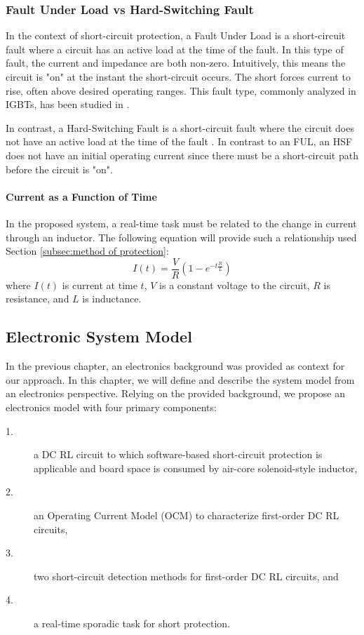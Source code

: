 \subsubsection{Fault Under Load vs Hard-Switching Fault}
In the context of short-circuit protection, a Fault Under Load is a short-circuit fault where a circuit has an active load at the time of the fault. In this type of fault, the current and impedance are both non-zero. Intuitively, this means the circuit is "on" at the instant the short-circuit occurs. The short forces current to rise, often above desired operating ranges. This fault type, commonly analyzed in IGBTs, has been studied in \cite{pagano_short_2005}.

In contrast, a Hard-Switching Fault is a short-circuit fault where the circuit does not have an active load at the time of the fault \cite{horiguchi_high-speed_2015}. In contrast to an FUL, an HSF does not have an initial operating current since there must be a short-circuit path before the circuit is "on".

\paragraph{Current as a Function of Time}
In the proposed system, a real-time task must be related to the change in current through an inductor. The following equation will provide such a relationship used Section \ref{subsec:method of protection}:
\begin{equation}\label{eq:CurrentAtTime}
I(t) = \frac{V}{R}(1-e^{-t \frac{R}{L}})
\end{equation}
where $I(t)$ is current at time $t$, $V$ is a constant voltage to the circuit, $R$ is resistance, and $L$ is inductance.
\clearpage \subsection{Electronic System Model}\label{subsec:electronic system model}
In the previous chapter, an electronics background was provided as context for our approach. In this chapter, we will define and describe the system model from an electronics perspective. Relying on the provided background, we propose an electronics model with four primary components:
\begin{description}
\item [1.] a DC RL circuit to which software-based short-circuit protection is applicable and board space is consumed by air-core solenoid-style inductor,
\item [2.] an Operating Current Model (OCM) to characterize first-order DC RL circuits,
\item [3.] two short-circuit detection methods for first-order DC RL circuits, and
\item [4.] a real-time sporadic task for short protection.
\end{description}

